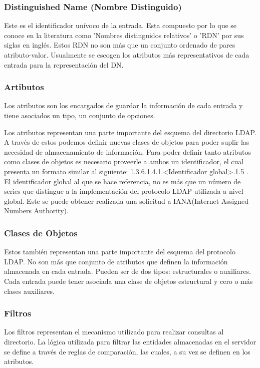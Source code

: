 \subsubsection{Distinguished Name (Nombre Distinguido)}
Este es el identificador un\'ivoco de la entrada. Esta compuesto por lo que se conoce en la literatura como 'Nombres distinguidos relativos' o 'RDN' por sus siglas en ingl\'es. Estos RDN no son m\'as que un conjunto ordenado de pares atributo-valor. Usualmente se escogen los atributos m\'as representativos de cada entrada para la representaci\'on del DN.
\subsubsection{Artibutos}
Los atributos son los encargados de guardar la informaci\'on de cada entrada y tiene asociados un tipo, un conjunto de opciones.

Los atributos representan una parte importante del esquema del directorio LDAP. A trav\'es de estos podemos definir nuevas clases de objetos para poder suplir las necesidad de almacenamiento de informaci\'on. Para poder definir tanto atributos como clases de objetos es necesario proveerle a ambos un identificador, el cual presenta un formato similar al siguiente: 1.3.6.1.4.1.<Identificador global>.1.5 .
El identificador global al que se hace referencia, no es m\'as que un n\'umero de series que distingue a la implementaci\'on del protocolo LDAP utilizada a nivel global. Este se puede obtener realizada una solicitud a IANA(Internet Assigned Numbers Authority).
\subsubsection{Clases de Objetos}
Estos tambi\'en representan una parte importante del esquema del protocolo LDAP. No son m\'as que conjunto de atributos que definen la informaci\'on almacenada en cada entrada. Pueden ser de dos tipos: estructurales o auxiliares. Cada entrada puede tener asociada una clase de objetos estructural y cero o m\'as clases auxiliares.
\subsubsection{Filtros}
Los filtros representan el mecanismo utilizado para realizar consultas al directorio. La l\'ogica utilizada para filtrar las entidades almacenadas en el servidor se define a trav\'es de reglas de comparaci\'on, las cuales, a su vez se definen en los atributos.

